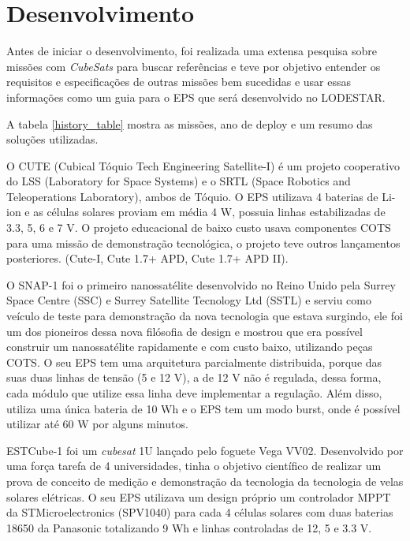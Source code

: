 \chapter{Desenvolvimento} \label{desenvolvimento}

Antes de iniciar o desenvolvimento, foi realizada uma extensa pesquisa sobre missões com \textit{CubeSats} para buscar referências e teve por objetivo entender os requisitos e especificações de outras missões bem sucedidas e usar essas informações como um guia para o EPS que será desenvolvido no LODESTAR. 

A tabela \ref{history_table} mostra as missões, ano de deploy e um resumo das soluções utilizadas.



O CUTE \cite{cute1_ref} (Cubical  Tóquio  Tech  Engineering  Satellite-I) é um projeto cooperativo do LSS (Laboratory for Space Systems) e o SRTL (Space Robotics and Teleoperations Laboratory), ambos de Tóquio. O EPS utilizava 4 baterias de Li-ion e as células solares proviam em média 4 W, possuia linhas estabilizadas de 3.3, 5, 6 e 7 V. O  projeto  educacional  de  baixo  custo  usava componentes COTS para uma missão de demonstração tecnológica, o projeto teve outros lançamentos posteriores. (Cute-I, Cute 1.7+ APD, Cute 1.7+ APD II). 

O SNAP-1 \cite{snap1_ref} foi o primeiro nanossatélite desenvolvido no Reino Unido pela Surrey Space Centre (SSC) e Surrey Satellite Tecnology Ltd (SSTL) e serviu como veículo de teste para demonstração da nova tecnologia que estava surgindo, ele foi um dos pioneiros dessa nova filósofia de design e mostrou que era possível construir um nanossatélite rapidamente e com custo baixo, utilizando peças COTS. O seu EPS tem uma arquitetura parcialmente distribuida, porque das suas duas linhas de tensão (5 e 12 V), a de 12 V não é regulada, dessa forma, cada módulo que utilize essa linha deve implementar a regulação. Além disso, utiliza uma única bateria de 10 Wh e o EPS tem um modo burst, onde é possível utilizar até 60 W por alguns minutos.

ESTCube-1 \cite{estcube1_ref} foi um \textit{cubesat} 1U lançado pelo foguete Vega VV02. Desenvolvido por uma força tarefa de 4 universidades, tinha o objetivo científico de realizar um prova de conceito de medição e demonstração da tecnologia da tecnologia de velas solares elétricas. O seu EPS utilizava um design próprio um controlador MPPT da STMicroelectronics (SPV1040) para cada 4 células solares com duas baterias 18650 da Panasonic totalizando 9 Wh e linhas controladas de 12, 5 e 3.3 V.

